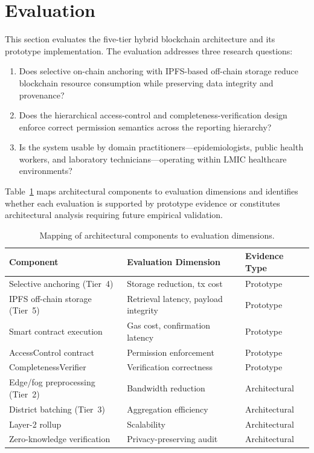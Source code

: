 \documentclass[AMA,LATO1COL]{WileyNJD-v2}
\begin{document}
\section{Evaluation}\label{sec:evaluation}

This section evaluates the five-tier hybrid blockchain architecture and its prototype implementation. The evaluation addresses three research questions:

\begin{enumerate}
\item[\textbf{EQ1.}] Does selective on-chain anchoring with IPFS-based off-chain storage reduce blockchain resource consumption while preserving data integrity and provenance?
\item[\textbf{EQ2.}] Does the hierarchical access-control and completeness-verification design enforce correct permission semantics across the reporting hierarchy?
\item[\textbf{EQ3.}] Is the system usable by domain practitioners---epidemiologists, public health workers, and laboratory technicians---operating within LMIC healthcare environments?
\end{enumerate}

Table~\ref{tab:eval_mapping} maps architectural components to evaluation dimensions and identifies whether each evaluation is supported by prototype evidence or constitutes architectural analysis requiring future empirical validation.

\begin{table}[!ht]
\caption{Mapping of architectural components to evaluation dimensions.}\label{tab:eval_mapping}
\centering
\small
\begin{tabular}{p{3.2cm}p{2.4cm}p{2.0cm}}
\toprule
\textbf{Component} & \textbf{Evaluation Dimension} & \textbf{Evidence Type} \\
\midrule
Selective anchoring (Tier~4) & Storage reduction, tx cost & Prototype \\
IPFS off-chain storage (Tier~5) & Retrieval latency, payload integrity & Prototype \\
Smart contract execution & Gas cost, confirmation latency & Prototype \\
AccessControl contract & Permission enforcement & Prototype \\
CompletenessVerifier & Verification correctness & Prototype \\
Edge/fog preprocessing (Tier~2) & Bandwidth reduction & Architectural \\
District batching (Tier~3) & Aggregation efficiency & Architectural \\
Layer-2 rollup & Scalability & Architectural \\
Zero-knowledge verification & Privacy-preserving audit & Architectural \\
\bottomrule
\end{tabular}
\end{table}
\end{document}
